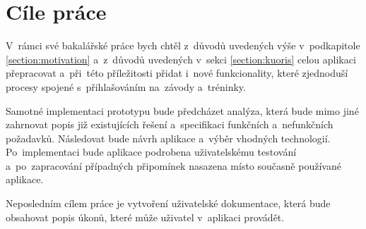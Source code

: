 \section{Cíle práce}
V~rámci své bakalářské práce bych chtěl z~důvodů uvedených výše v~podkapitole \ref{section:motivation} a~z~důvodů uvedených v~sekci \ref{section:kuoris} celou aplikaci přepracovat a~při~této příležitosti přidat i~nové funkcionality, které zjednoduší procesy spojené s~přihlašováním na~závody a~tréninky.
 
Samotné implementaci prototypu bude předcházet analýza, která bude mimo jiné zahrnovat popis již existujících řešení a~specifikaci funkčních a~nefunkčních požadavků. Následovat bude návrh aplikace a~výběr vhodných technologií. Po~implementaci bude aplikace podrobena uživatelskému testování a~po~zapracování případných připomínek nasazena místo současně používané aplikace.

Neposledním cílem práce je vytvoření uživatelské dokumentace, která bude obsahovat popis úkonů, které může uživatel v~aplikaci provádět.
